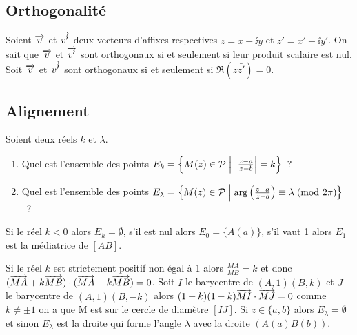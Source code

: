 \subsection{Orthogonalité}
\label{subsec:complexeorthogonalite}
Soient \(\overrightarrow{v}\) et \(\overrightarrow{v'}\) deux vecteurs d'affixes respectives 
\(z=x+\ii y\) et \(z'=x'+\ii y'\). On sait que \(\overrightarrow{v}\) et \(\overrightarrow{v'}\) 
sont orthogonaux si et seulement si leur produit scalaire est nul. Soit 
\(\overrightarrow{v}\) et \(\overrightarrow{v'}\) sont orthogonaux si et seulement si \(\Re(z 
\bar{z'})=0\).
\subsection{Alignement}
\label{subsec:complexealignement}
Soient deux réels \(k\) et \(\lambda\).
\begin{enumerate}
    \item Quel est l'ensemble des points \(E_k = \left\{M(z) \in 
        \mathcal{P}\mathrel{}\middle|\mathrel{}\left\lvert\frac{z-a}{z-b}\right\rvert=k\right\}\)~?
    \item Quel est l'ensemble des points \(E_\lambda = \left\{M(z) \in 
        \mathcal{P}\mathrel{}\middle|\mathrel{}\arg \left(\frac{z-a}{z-b} \right) \equiv \lambda\!\pmod {2\pi}\right\}\)~?
\end{enumerate}
Si le réel \(k<0\) alors \(E_k=\emptyset\), s'il est nul alors \(E_0=\{A(a)\}\), 
s'il vaut 1 alors \(E_1\) est la médiatrice de \([AB]\).

Si le réel \(k\) est strictement positif non égal à 1 alors \(\frac{MA}{MB}=k\) 
et donc \((\overrightarrow{MA}+k\overrightarrow{MB}) \cdot (\overrightarrow{MA}-k\overrightarrow{MB})=0\). Soit \(I\) le 
barycentre de \((A,1)(B,k)\) et \(J\) le barycentre de \((A,1)(B,-k)\) alors 
\((1+k)(1-k) \overrightarrow{MI} \cdot \overrightarrow{MJ} =0\) comme \(k \neq \pm 1\) on a que M 
est sur le cercle de diamètre \([IJ]\).
Si \(z \in \{a,b\}\) alors \(E_\lambda=\emptyset\) et sinon \(E_\lambda\) est la 
droite qui forme l'angle \(\lambda\) avec la droite \((A(a)B(b))\).
